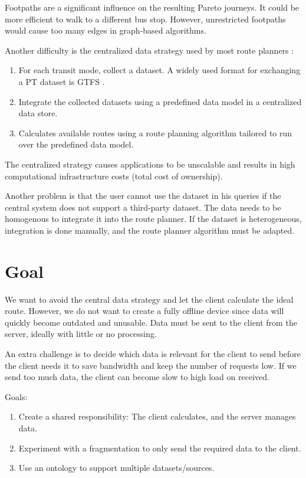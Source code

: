 Footpaths are a significant influence on the resulting Pareto journeys. It could be more efficient to walk to a different bus stop. However, unrestricted footpaths would cause too many edges in graph-based algorithms.

Another difficulty is the centralized data strategy used by most route planners \cite{rojas_melendez_julian_andres_decentralized_2020}:
\begin{enumerate}
    \item For each transit mode, collect a dataset. A widely used format for exchanging a PT dataset is GTFS \cite{noauthor_gtfs_2022}.
    \item Integrate the collected datasets using a predefined data model in a centralized data store.
    \item Calculates available routes using a route planning algorithm tailored to run over the predefined data model.
\end{enumerate}
The centralized strategy causes applications to be unscalable and results in high computational infrastructure costs (total cost of ownership). 

Another problem is that the user cannot use the dataset in his queries if the central system does not support a third-party dataset. The data needs to be homogenous to integrate it into the route planner. If the dataset is heterogeneous, integration is done manually, and the route planner algorithm must be adapted.

\section{Goal}

We want to avoid the central data strategy and let the client calculate the ideal route. However, we do not want to create a fully offline device since data will quickly become outdated and unusable. Data must be sent to the client from the server, ideally with little or no processing. 

An extra challenge is to decide which data is relevant for the client to send before the client needs it to save bandwidth and keep the number of requests low. If we send too much data, the client can become slow to high load on received.
 
Goals:
\begin{enumerate}
    \item Create a shared responsibility: The client calculates, and the server manages data.
    \item Experiment with a fragmentation to only send the required data to the client.
    \item Use an ontology to support multiple datasets/sources.
\end{enumerate}

